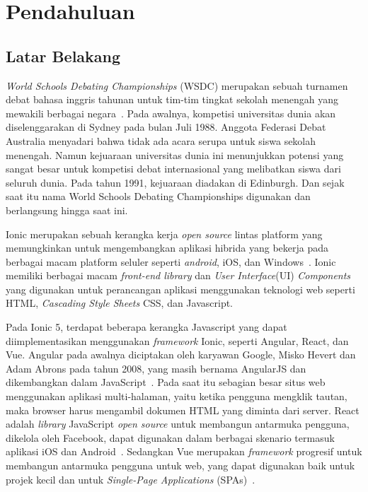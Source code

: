 \chapter{Pendahuluan}
\label{chap:intro}
   
\section{Latar Belakang}
\label{sec:label}

\textit{World Schools Debating Championships} (WSDC) merupakan sebuah turnamen debat bahasa inggris tahunan untuk tim-tim tingkat sekolah menengah yang mewakili berbagai negara~\cite{wsdc}. Pada awalnya, kompetisi universitas dunia akan diselenggarakan di Sydney pada bulan Juli 1988. Anggota Federasi Debat Australia menyadari bahwa tidak ada acara serupa untuk siswa sekolah menengah. Namun kejuaraan universitas dunia ini menunjukkan potensi yang sangat besar untuk kompetisi debat internasional yang melibatkan siswa dari seluruh dunia. Pada tahun 1991, kejuaraan diadakan di Edinburgh. Dan sejak saat itu nama World Schools Debating Championships digunakan dan berlangsung hingga saat ini. 

Ionic merupakan sebuah kerangka kerja {\it open source} lintas platform yang memungkinkan untuk mengembangkan aplikasi hibrida yang bekerja pada berbagai macam platform seluler seperti {\it android}, iOS, dan Windows~\cite{waranashiwar:18:ionic}. Ionic memiliki berbagai macam \textit{front-end library} dan \textit{User Interface}(UI) {\it Components} yang digunakan untuk  perancangan aplikasi menggunakan teknologi web seperti HTML, {\it Cascading Style Sheets} CSS, dan Javascript. 

Pada Ionic 5, terdapat beberapa kerangka Javascript yang dapat diimplementasikan menggunakan \textit{framework} Ionic, seperti Angular, React, dan Vue. Angular pada awalnya diciptakan oleh karyawan Google, Misko Hevert dan Adam Abrons pada tahun 2008, yang masih bernama AngularJS dan dikembangkan dalam JavaScript~\cite{wohlgethan:18:supporting}. Pada saat itu sebagian besar situs web menggunakan aplikasi multi-halaman, yaitu ketika pengguna mengklik tautan, maka browser harus mengambil dokumen HTML yang diminta dari server. React adalah \textit{library} JavaScript {\it open source} untuk membangun antarmuka pengguna, dikelola oleh Facebook, dapat digunakan dalam berbagai skenario termasuk aplikasi iOS dan Android~\cite{wohlgethan:18:supporting}. Sedangkan Vue merupakan \textit{framework}  progresif untuk membangun antarmuka pengguna untuk web, yang dapat digunakan baik untuk projek kecil dan untuk {\it Single-Page Applications} (SPAs)~\cite{wohlgethan:18:supporting}.

